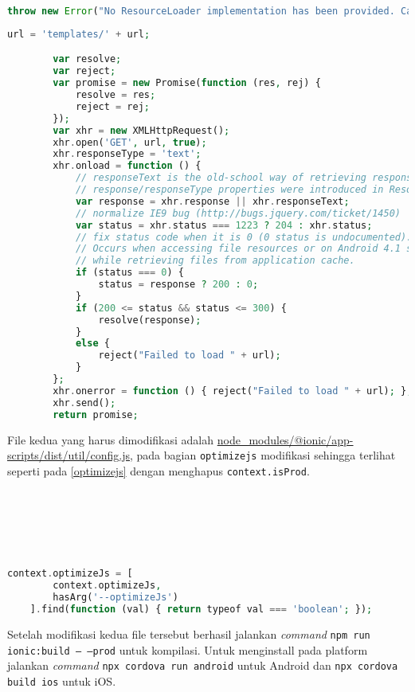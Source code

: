 \begin{lstlisting}[frame=single, label={lst:noresourceloader}, language=PHP, caption=Fungsi \texttt{get} pada \textunderscore NO\textunderscore RESOURCE\textunderscore LOADER]
throw new Error("No ResourceLoader implementation has been provided. Can't read the url \"" + url + "\"");
\end{lstlisting}

\begin{lstlisting}[frame=single, label={lst:noresourceloaderreplace}, language=PHP, caption=Kode pengganti untuk fungsi \texttt{get}]
url = 'templates/' + url;

        var resolve;
        var reject;
        var promise = new Promise(function (res, rej) {
            resolve = res;
            reject = rej;
        });
        var xhr = new XMLHttpRequest();
        xhr.open('GET', url, true);
        xhr.responseType = 'text';
        xhr.onload = function () {
            // responseText is the old-school way of retrieving response (supported by IE8 & 9)
            // response/responseType properties were introduced in ResourceLoader Level2 spec (supported by IE10)
            var response = xhr.response || xhr.responseText;
            // normalize IE9 bug (http://bugs.jquery.com/ticket/1450)
            var status = xhr.status === 1223 ? 204 : xhr.status;
            // fix status code when it is 0 (0 status is undocumented).
            // Occurs when accessing file resources or on Android 4.1 stock browser
            // while retrieving files from application cache.
            if (status === 0) {
                status = response ? 200 : 0;
            }
            if (200 <= status && status <= 300) {
                resolve(response);
            }
            else {
                reject("Failed to load " + url);
            }
        };
        xhr.onerror = function () { reject("Failed to load " + url); };
        xhr.send();
        return promise;
\end{lstlisting}

File kedua yang harus dimodifikasi adalah \url{node_modules/@ionic/app-scripts/dist/util/config.js}, pada bagian \texttt{optimizejs} modifikasi sehingga terlihat seperti pada \mbox{\ref{optimizejs}} dengan menghapus \texttt{context.isProd}.
\\
\\
\\
\\
\\
\\
\begin{lstlisting}[frame=single, label={optimizejs}, language=PHP, caption= \texttt{optimizejs} setelah modifikasi]
context.optimizeJs = [
        context.optimizeJs,
        hasArg('--optimizeJs')
    ].find(function (val) { return typeof val === 'boolean'; });
\end{lstlisting}
Setelah modifikasi kedua file tersebut berhasil jalankan \textit{command} \texttt{npm run ionic:build -- --prod} untuk kompilasi. Untuk menginstall pada platform jalankan \textit{command} \texttt{npx cordova run android} untuk Android dan \texttt{npx cordova build ios} untuk iOS.

